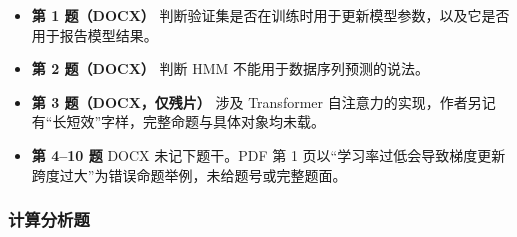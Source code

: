 \documentclass[UTF8,a4paper,zihao=-4,fontset=fandol]{ctexart}
\begin{document}
\begin{itemize}
\item \textbf{第 1 题（DOCX）} 判断验证集是否在训练时用于更新模型参数，以及它是否用于报告模型结果。
\item \textbf{第 2 题（DOCX）} 判断 HMM 不能用于数据序列预测的说法。
\item \textbf{第 3 题（DOCX，仅残片）} 涉及 Transformer 自注意力的实现，作者另记有“长短效”字样，完整命题与具体对象均未载。
\item \textbf{第 4–10 题} DOCX 未记下题干。PDF 第 1 页以“学习率过低会导致梯度更新跨度过大”为错误命题举例，未给题号或完整题面。
\end{itemize}

\subsubsection{计算分析题}
\end{document}
